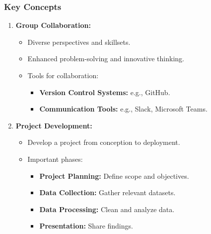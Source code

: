 \documentclass[aspectratio=169]{beamer}
\begin{document}
\begin{frame}[fragile]
    \frametitle{Key Concepts}
    \begin{enumerate}
        \item \textbf{Group Collaboration:}
        \begin{itemize}
            \item Diverse perspectives and skillsets.
            \item Enhanced problem-solving and innovative thinking.
            \item Tools for collaboration:
            \begin{itemize}
                \item \textbf{Version Control Systems:} e.g., GitHub.
                \item \textbf{Communication Tools:} e.g., Slack, Microsoft Teams.
            \end{itemize}
        \end{itemize}
        
        \item \textbf{Project Development:}
        \begin{itemize}
            \item Develop a project from conception to deployment.
            \item Important phases:
            \begin{itemize}
                \item \textbf{Project Planning:} Define scope and objectives.
                \item \textbf{Data Collection:} Gather relevant datasets.
                \item \textbf{Data Processing:} Clean and analyze data.
                \item \textbf{Presentation:} Share findings.
            \end{itemize}
        \end{itemize}
    \end{enumerate}
\end{frame}
\end{document}
